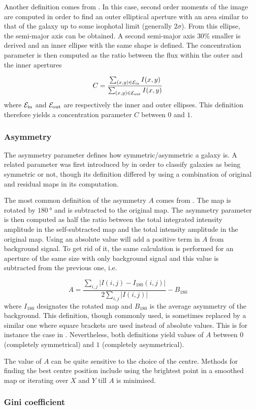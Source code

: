 Another definition comes from . In this case, second order moments of the image are computed in order to find an outer elliptical aperture with an area similar to that of the galaxy up to some isophotal limit (generally $2\sigma$). From this ellipse, the semi-major axis can be obtained. A second semi-major axis $30\%$ smaller is derived and an inner ellipse with the same shape is defined. The concentration parameter is then computed as the ratio between the flux within the outer and the inner apertures

\begin{equation}
	C = \frac{\sum_{(x, y) \in \rm{\mathcal{E}_{in}}} I(x, y)}{\sum_{(x, y) \in \rm{\mathcal{E}_{out}}} I(x, y)}
	\label{eq:concentration_abraham_form}
\end{equation}
where $\rm{\mathcal{E}_{in}}$ and $\rm{\mathcal{E}_{out}}$ are respectively the inner and outer ellipses. This definition therefore yields a concentration parameter $C$ between $0$ and $1$.

\subsubsection{Asymmetry}

The asymmetry parameter defines how symmetric/asymmetric a galaxy is. A related parameter was first introduced by  in order to classify galaxies as being symmetric or not, though its definition differed by using a combination of original and residual maps in its computation.

The most common definition of the asymmetry $A$ comes from . The map is rotated by $\SI{180}{\degree}$ and is subtracted to the original map. The asymmetry parameter is then computed as half the ratio between the total integrated intensity amplitude in the self-subtracted map and the total intensity amplitude in the original map. Using an absolute value will add a positive term in $A$ from background signal. To get rid of it, the same calculation is performed for an aperture of the same size with only background signal and this value is subtracted from the previous one, i.e.

\begin{equation}
	A = \frac{\sum_{i , j} \left | I(i,j) - I_{180} (i , j) \right | }{2 \sum_{i, j} \left | I(i,j) \right |} - B_{180}
\end{equation}
where $I_{180}$ designates the rotated map and $B_{180}$ is the average asymmetry of the background. This definition, though commonly used, is sometimes replaced by a similar one where square brackets are used instead of absolute values. This is for instance the case in . Nevertheless, both definitions yield values of $A$ between $0$ (completely symmetrical) and $1$ (completely asymmetrical).

The value of $A$ can be quite sensitive to the choice of the centre. Methods for finding the best centre position include using the brightest point in a smoothed map or iterating over $X$ and $Y$ till $A$ is minimised.

\subsubsection{Gini coefficient}
